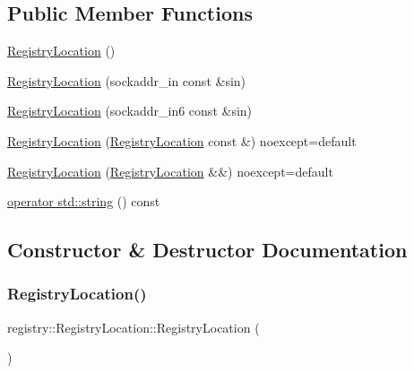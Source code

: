 \subsection*{Public Member Functions}
\begin{DoxyCompactItemize}
\item 
\hyperlink{structregistry_1_1RegistryLocation_ac6b631fa4b858ce564b27721b48d7003}{Registry\+Location} ()
\item 
\hyperlink{structregistry_1_1RegistryLocation_ab0c8baec283cc829565384827e047c11}{Registry\+Location} (sockaddr\+\_\+in const \&sin)
\item 
\hyperlink{structregistry_1_1RegistryLocation_a2404f5898bcca22f2ecdf6ca9819f960}{Registry\+Location} (sockaddr\+\_\+in6 const \&sin)
\item 
\hyperlink{structregistry_1_1RegistryLocation_a247cc18e334935821e43747e64fe1dbd}{Registry\+Location} (\hyperlink{structregistry_1_1RegistryLocation}{Registry\+Location} const \&) noexcept=default
\item 
\hyperlink{structregistry_1_1RegistryLocation_aa10c59ff5a9fabb9f03d5185b9dc9b43}{Registry\+Location} (\hyperlink{structregistry_1_1RegistryLocation}{Registry\+Location} \&\&) noexcept=default
\item 
\hyperlink{structregistry_1_1RegistryLocation_a2db59567048805fcfbd7edf47dde92ea}{operator std\+::string} () const
\end{DoxyCompactItemize}


\subsection{Constructor \& Destructor Documentation}
\mbox{\label{structregistry_1_1RegistryLocation_ac6b631fa4b858ce564b27721b48d7003}} 
\subsubsection{\texorpdfstring{Registry\+Location()}{RegistryLocation()}\hspace{0.1cm}{\footnotesize\ttfamily [1/5]}}
{\footnotesize\ttfamily registry\+::\+Registry\+Location\+::\+Registry\+Location (\begin{DoxyParamCaption}{ }\end{DoxyParamCaption})\hspace{0.3cm}{\ttfamily [inline]}}


